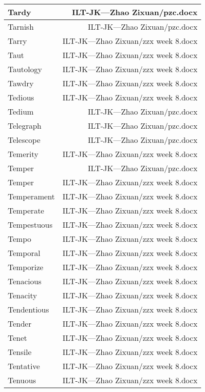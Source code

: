 \documentclass{article}
\begin{document}
\begin{center}
\begin{longtable}{|l|r|}
\hline
Tardy  &  ILT-JK---Zhao Zixuan/pzc.docx\\  
\hline
Tarnish  &  ILT-JK---Zhao Zixuan/pzc.docx\\  
\hline
Tarry  &  ILT-JK---Zhao Zixuan/zzx week 8.docx\\  
\hline
Taut  &  ILT-JK---Zhao Zixuan/zzx week 8.docx\\  
\hline
Tautology  &  ILT-JK---Zhao Zixuan/zzx week 8.docx\\  
\hline
Tawdry  &  ILT-JK---Zhao Zixuan/zzx week 8.docx\\  
\hline
Tedious  &  ILT-JK---Zhao Zixuan/zzx week 8.docx\\  
\hline
Tedium  &  ILT-JK---Zhao Zixuan/pzc.docx\\  
\hline
Telegraph  &  ILT-JK---Zhao Zixuan/pzc.docx\\  
\hline
Telescope  &  ILT-JK---Zhao Zixuan/pzc.docx\\  
\hline
Temerity  &  ILT-JK---Zhao Zixuan/zzx week 8.docx\\  
\hline
Temper  &  ILT-JK---Zhao Zixuan/pzc.docx\\  
\hline
Temper  &  ILT-JK---Zhao Zixuan/zzx week 8.docx\\  
\hline
Temperament  &  ILT-JK---Zhao Zixuan/zzx week 8.docx\\  
\hline
Temperate  &  ILT-JK---Zhao Zixuan/zzx week 8.docx\\  
\hline
Tempestuous  &  ILT-JK---Zhao Zixuan/zzx week 8.docx\\  
\hline
Tempo  &  ILT-JK---Zhao Zixuan/zzx week 8.docx\\  
\hline
Temporal  &  ILT-JK---Zhao Zixuan/zzx week 8.docx\\  
\hline
Temporize  &  ILT-JK---Zhao Zixuan/zzx week 8.docx\\  
\hline
Tenacious  &  ILT-JK---Zhao Zixuan/zzx week 8.docx\\  
\hline
Tenacity  &  ILT-JK---Zhao Zixuan/zzx week 8.docx\\  
\hline
Tendentious  &  ILT-JK---Zhao Zixuan/zzx week 8.docx\\  
\hline
Tender  &  ILT-JK---Zhao Zixuan/zzx week 8.docx\\  
\hline
Tenet  &  ILT-JK---Zhao Zixuan/zzx week 8.docx\\  
\hline
Tensile  &  ILT-JK---Zhao Zixuan/zzx week 8.docx\\  
\hline
Tentative  &  ILT-JK---Zhao Zixuan/zzx week 8.docx\\  
\hline
Tenuous  &  ILT-JK---Zhao Zixuan/zzx week 8.docx\\  

\end{longtable}
\end{center}
\end{document}

